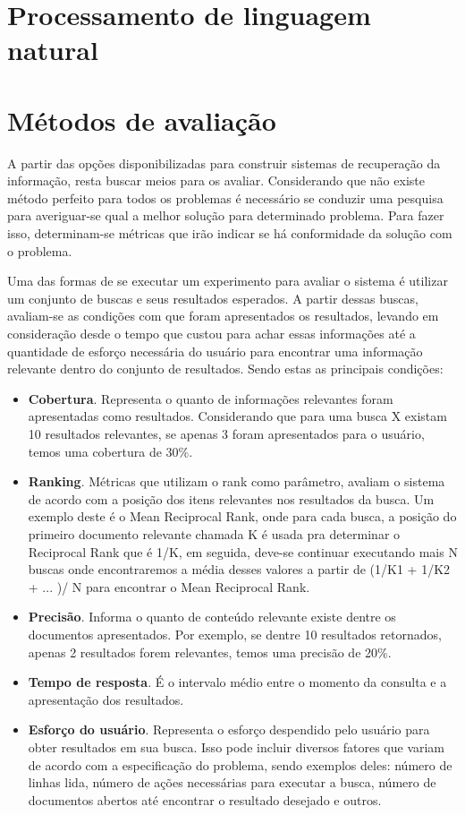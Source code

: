 \section{Processamento de linguagem natural}
 


\section{Métodos de avaliação}
A partir das opções disponibilizadas para construir sistemas de recuperação da informação, resta buscar meios para os avaliar. Considerando que não existe método perfeito para todos os problemas é necessário se conduzir uma pesquisa para averiguar-se qual a melhor solução para determinado problema. Para fazer isso, determinam-se métricas que irão indicar se há conformidade da solução com o problema.

Uma das formas de se executar um experimento para avaliar o sistema é utilizar um conjunto de buscas e seus resultados esperados. A partir dessas buscas, avaliam-se as condições com que foram apresentados os resultados, levando em consideração desde o tempo que custou para achar essas informações até a quantidade de esforço necessária do usuário para encontrar uma informação relevante dentro do conjunto de resultados. Sendo estas as principais condições:
\begin{itemize}
    \item \textbf{Cobertura}. Representa o quanto de informações relevantes foram apresentadas como resultados. Considerando que para uma busca X existam 10 resultados relevantes, se apenas 3 foram apresentados para o usuário, temos uma cobertura de 30\%.
    \item \textbf{Ranking}. Métricas que utilizam o rank como parâmetro, avaliam o sistema de acordo com a posição dos itens relevantes nos resultados da busca. Um exemplo deste é o Mean Reciprocal Rank, onde para cada busca, a posição do primeiro documento relevante chamada K é usada pra determinar o Reciprocal Rank que é 1/K, em seguida, deve-se continuar executando mais N buscas onde encontraremos a média desses valores a partir de (1/K1 + 1/K2 + ... )/ N para encontrar o Mean Reciprocal Rank.
    \item \textbf{Precisão}. Informa o quanto de conteúdo relevante existe dentre os documentos apresentados. Por exemplo, se dentre 10 resultados retornados, apenas 2 resultados forem relevantes, temos uma precisão de 20\%.
    \item \textbf{Tempo de resposta}. É o intervalo médio entre o momento da consulta e a apresentação dos resultados.
    \item \textbf{Esforço do usuário}. Representa o esforço despendido pelo usuário para obter resultados em sua busca. Isso pode incluir diversos fatores que variam de acordo com a especificação do problema, sendo exemplos deles: número de linhas lida, número de ações necessárias para executar a busca, número de documentos abertos até encontrar o resultado desejado e outros.
\end{itemize}

